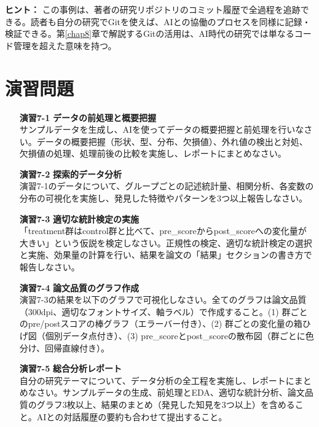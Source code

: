 \begin{screen}
\textbf{ヒント：} この事例は、著者の研究リポジトリのコミット履歴で全過程を追跡できる。読者も自分の研究でGitを使えば、AIとの協働のプロセスを同様に記録・検証できる。第\ref{chap8}章で解説するGitの活用は、AI時代の研究では単なるコード管理を超えた意味を持つ。
\end{screen}

\section*{演習問題}

\begin{enumerate}
\item[\textbf{演習7-1}] \textbf{データの前処理と概要把握}\\
サンプルデータを生成し、AIを使ってデータの概要把握と前処理を行いなさい。データの概要把握（形状、型、分布、欠損値）、外れ値の検出と対処、欠損値の処理、処理前後の比較を実施し、レポートにまとめなさい。

\item[\textbf{演習7-2}] \textbf{探索的データ分析}\\
演習7-1のデータについて、グループごとの記述統計量、相関分析、各変数の分布の可視化を実施し、発見した特徴やパターンを3つ以上報告しなさい。

\item[\textbf{演習7-3}] \textbf{適切な統計検定の実施}\\
「treatment群はcontrol群と比べて、pre\_scoreからpost\_scoreへの変化量が大きい」という仮説を検定しなさい。正規性の検定、適切な統計検定の選択と実施、効果量の計算を行い、結果を論文の「結果」セクションの書き方で報告しなさい。

\item[\textbf{演習7-4}] \textbf{論文品質のグラフ作成}\\
演習7-3の結果を以下のグラフで可視化しなさい。全てのグラフは論文品質（300dpi、適切なフォントサイズ、軸ラベル）で作成すること。(1) 群ごとのpre/postスコアの棒グラフ（エラーバー付き）、(2) 群ごとの変化量の箱ひげ図（個別データ点付き）、(3) pre\_scoreとpost\_scoreの散布図（群ごとに色分け、回帰直線付き）。

\item[\textbf{演習7-5}] \textbf{総合分析レポート}\\
自分の研究テーマについて、データ分析の全工程を実施し、レポートにまとめなさい。サンプルデータの生成、前処理とEDA、適切な統計分析、論文品質のグラフ3枚以上、結果のまとめ（発見した知見を3つ以上）を含めること。AIとの対話履歴の要約も合わせて提出すること。
\end{enumerate}
